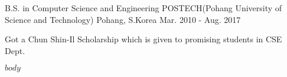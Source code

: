 \documentclass{cool-cv}
\begin{document}
\makecvheader[C]


\begin{cventries}
  \cventry
    {B.S. in Computer Science and Engineering} %
    {POSTECH(Pohang University of Science and Technology)} %
    {Pohang, S.Korea} %
    {Mar. 2010 - Aug. 2017} %
    {
      \begin{cvitems} %
        \item {Got a Chun Shin-Il Scholarship which is given to promising students in CSE Dept.}
      \end{cvitems} 
    }

\end{cventries}

$body$
\end{document}
